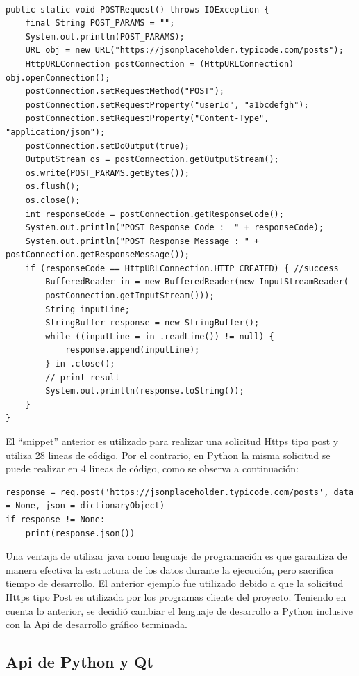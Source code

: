 \begin{Verbatim}[tabsize=4]

public static void POSTRequest() throws IOException {
	final String POST_PARAMS = "";
	System.out.println(POST_PARAMS);
	URL obj = new URL("https://jsonplaceholder.typicode.com/posts");
	HttpURLConnection postConnection = (HttpURLConnection) obj.openConnection();
	postConnection.setRequestMethod("POST");
	postConnection.setRequestProperty("userId", "a1bcdefgh");
	postConnection.setRequestProperty("Content-Type", "application/json");
	postConnection.setDoOutput(true);
	OutputStream os = postConnection.getOutputStream();
	os.write(POST_PARAMS.getBytes());
	os.flush();
	os.close();
	int responseCode = postConnection.getResponseCode();
	System.out.println("POST Response Code :  " + responseCode);
	System.out.println("POST Response Message : " + postConnection.getResponseMessage());
	if (responseCode == HttpURLConnection.HTTP_CREATED) { //success
		BufferedReader in = new BufferedReader(new InputStreamReader(
		postConnection.getInputStream()));
		String inputLine;
		StringBuffer response = new StringBuffer();
		while ((inputLine = in .readLine()) != null) {
			response.append(inputLine);
		} in .close();
		// print result
		System.out.println(response.toString());
	}
}
\end{Verbatim}
El ``snippet'' anterior es utilizado para realizar una solicitud Https tipo post y utiliza 28 lineas de código. Por el contrario, en Python la misma solicitud se puede realizar en 4 lineas de código, como se observa a continuación:

\begin{Verbatim}[tabsize=4]
response = req.post('https://jsonplaceholder.typicode.com/posts', data = None, json = dictionaryObject) 
if response != None:
	print(response.json())      
\end{Verbatim}

Una ventaja de utilizar java como lenguaje de programación es que garantiza de manera efectiva la estructura de los datos durante la ejecución, pero sacrifica tiempo de desarrollo. El anterior ejemplo fue utilizado debido a que la solicitud Https tipo Post es utilizada por los programas cliente del proyecto. Teniendo en cuenta lo anterior, se decidió cambiar el lenguaje de desarrollo a Python inclusive con la Api de desarrollo gráfico terminada.

\subsection{Api de Python y Qt}

